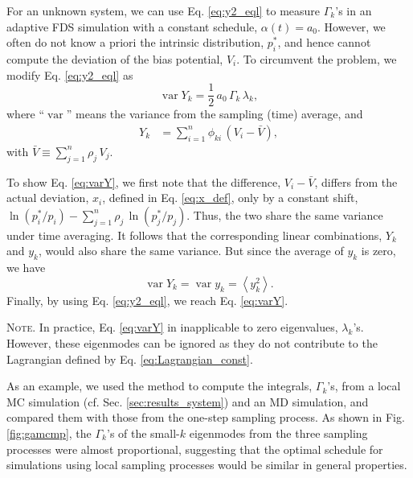 \documentclass[reprint, superscriptaddress, floatfix]{revtex4-1}
\newcommand{\note}[1]{{\color{DarkGreen}\footnotesize \textsc{Note.} #1}}
\begin{document}
%
For an unknown system,
we can use Eq. \eqref{eq:y2_eql} to
measure $\Gamma_k$'s in
an adaptive FDS simulation
with a constant schedule,
$\alpha(t) = a_0$.
%
However,
we often do not know a priori the intrinsic distribution, $p^*_i$,
and hence
cannot compute the deviation
of the bias potential, $V_i$.
%
To circumvent the problem, we
modify Eq. \eqref{eq:y2_eql} as
%
\begin{equation}
  \operatorname{var} Y_k
  =
  \frac{1}{2} \,
  a_0 \, \Gamma_k \, \lambda_k,
\label{eq:varY}
\end{equation}
%
where
``$\operatorname{var}$''
means the variance from the sampling (time) average,
and
%
\begin{align*}
Y_k
&=
\sum_{ i = 1 }^n
  \phi_{k i} \, (V_i - \bar V),
\end{align*}
%
with
$
\bar V
\equiv
\sum_{ j = 1 }^n \rho_j \, V_j.
$

To show Eq. \eqref{eq:varY},
we first note that
the difference, $V_i - {\bar V}$,
differs from the actual deviation, $x_i$,
defined in Eq. \eqref{eq:x_def},
only by a constant shift,
$\ln( p^*_i / p_i ) - \sum_{ j = 1 }^n \rho_j \, \ln( p^*_j / p_j )$.
%
Thus, the two share the same variance
under time averaging.
%
It follows that the corresponding linear combinations,
$Y_k$ and $y_k$, would also share the same variance.
%
But since the average of $y_k$ is zero,
we have
$$
\operatorname{var} Y_k
=
\operatorname{var} y_k
=
\left\langle y_k^2 \right\rangle.
$$
Finally, by using Eq. \eqref{eq:y2_eql},
we reach Eq. \eqref{eq:varY}.

\note{In practice, Eq. \eqref{eq:varY}
in inapplicable to zero eigenvalues, $\lambda_k$'s.
%
However, these eigenmodes can be ignored
as they do not contribute to the Lagrangian defined by
Eq. \eqref{eq:Lagrangian_const}.
}


As an example, we used the method to compute
the integrals, $\Gamma_k$'s, from
a local MC simulation
(cf. Sec. \ref{sec:results_system})
and an MD simulation,
and compared them with those from
the one-step sampling process.
%
As shown in Fig. \ref{fig:gamcmp},
the $\Gamma_k$'s of the small-$k$ eigenmodes
from the three sampling processes
were almost proportional,
suggesting that
the optimal schedule
for simulations using local sampling processes
would be similar in general properties.
\end{document}
